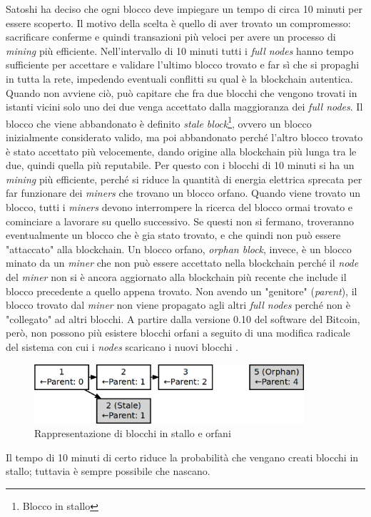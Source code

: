 \documentclass {article}
\begin{document}
Satoshi ha deciso che ogni blocco deve impiegare un tempo di circa 10 minuti per essere scoperto.
Il motivo della scelta è quello di aver trovato un compromesso: sacrificare conferme e quindi transazioni più veloci per avere un processo di \textit{mining} più efficiente.
Nell'intervallo di 10 minuti tutti i \textit{full nodes} hanno tempo sufficiente per accettare e validare l'ultimo blocco trovato e far sì che si propaghi in tutta la rete, impedendo eventuali conflitti su qual è la blockchain autentica. %
Quando non avviene ciò, può capitare che fra due blocchi che vengono trovati in istanti vicini solo uno dei due venga accettato dalla maggioranza dei \textit{full nodes}.
Il blocco che viene abbandonato è definito \textit{stale block}\footnote{Blocco in stallo}, ovvero un blocco inizialmente considerato valido, ma poi abbandonato perché l'altro blocco trovato è stato accettato più velocemente, dando origine alla blockchain più lunga tra le due, quindi quella più reputabile.
Per questo con i blocchi di 10 minuti si ha un \textit{mining} più efficiente, perché si riduce la quantità di energia elettrica sprecata per far funzionare dei \textit{miners} che trovano un blocco orfano.
Quando viene trovato un blocco, tutti i \textit{miners} devono interrompere la ricerca del blocco ormai trovato e cominciare a lavorare su quello successivo.
Se questi non si fermano, troveranno eventualmente un blocco che è gia stato trovato, e che quindi non può essere "attaccato" alla blockchain.
Un blocco orfano, \textit{orphan block}, invece, è un blocco minato da un \textit{miner} che non può essere accettato nella blockchain perché il \textit{node} del \textit{miner} non si è ancora aggiornato alla blockchain più recente che include il blocco precedente a quello appena trovato.
Non avendo un "genitore" (\textit{parent}), il blocco trovato dal \textit{miner} non viene propagato agli altri \textit{full nodes} perché non è "collegato" ad altri blocchi.
A partire dalla versione 0.10 del software del Bitcoin, però, non possono più esistere blocchi orfani a seguito di una modifica radicale del sistema con cui i \textit{nodes} scaricano i nuovi blocchi \cite{staleorphans}.

\vspace {0.5cm}
\begin{figure}[htb!]
\includegraphics [width = 10cm] {stale-orphan.png}
\centering
\caption {Rappresentazione di blocchi in stallo e orfani}
\end{figure}
\vspace {0.2cm}
\noindent
%
Il tempo di 10 minuti di certo riduce la probabilità che vengano creati blocchi in stallo; tuttavia è sempre possibile che nascano.
\end{document}
